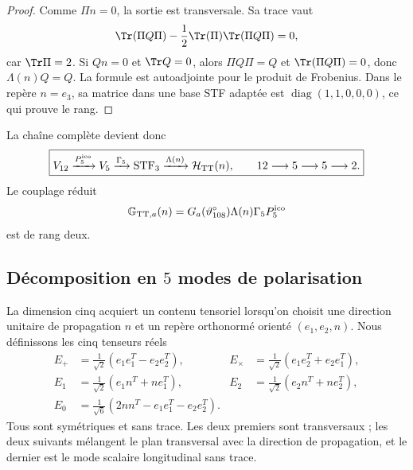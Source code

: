 \begin{proof}
Comme \(\Pi n=0\), la sortie est transversale. Sa trace vaut
\[
\Tr(\Pi Q\Pi)-\frac12\Tr(\Pi)\Tr(\Pi Q\Pi)=0,
\]
car \(\Tr\Pi=2\). Si \(Qn=0\) et \(\Tr Q=0\), alors
\(\Pi Q\Pi=Q\) et \(\Tr(\Pi Q\Pi)=0\), donc
\(\Lambda(n)Q=Q\). La formule est autoadjointe pour le produit de
Frobenius. Dans le repère \(n=e_3\), sa matrice dans une base STF adaptée est
\(\operatorname{diag}(1,1,0,0,0)\), ce qui prouve le rang.
\end{proof}

La chaîne complète devient donc
\begin{equation}
\label{ii:pent:eq:gravity-12-5-5-2}
\boxed{
V_{12}\xrightarrow{P^{\mathrm{ico}}_5}V_5
\xrightarrow{\Gamma_5}\operatorname{STF}_3
\xrightarrow{\Lambda(n)}\mathcal H_{\rm TT}(n),
\qquad 12\longrightarrow5\longrightarrow5\longrightarrow2.}
\end{equation}
Le couplage réduit
\begin{equation}
\label{ii:pent:eq:gravity-effective-map}
\mathbb G_{{\rm TT},a}(n)
=G_a(\vartheta^\circ_{108})\Lambda(n)\Gamma_5P^{\mathrm{ico}}_5
\end{equation}
est de rang deux.

\subsection{Décomposition en \(5\) modes de polarisation}

La dimension cinq acquiert un contenu tensoriel lorsqu’on choisit une direction
unitaire de propagation \(n\) et un repère orthonormé orienté
\((e_1,e_2,n)\). Nous définissons les cinq tenseurs réels
\begin{align}
E_{+}&=\frac1{\sqrt2}(e_1e_1^T-e_2e_2^T),
&E_{\times}&=\frac1{\sqrt2}(e_1e_2^T+e_2e_1^T),
\label{ii:pent:eq:gravity-helicity2-real}\\
E_{1}&=\frac1{\sqrt2}(e_1n^T+ne_1^T),
&E_{2}&=\frac1{\sqrt2}(e_2n^T+ne_2^T),
\label{ii:pent:eq:gravity-helicity1-real}\\
E_{0}&=\frac1{\sqrt6}(2nn^T-e_1e_1^T-e_2e_2^T).
\label{ii:pent:eq:gravity-helicity0-real}
\end{align}
Tous sont symétriques et sans trace. Les deux premiers sont transversaux ; les
deux suivants mélangent le plan transversal avec la direction de
propagation, et le dernier est le mode scalaire longitudinal sans trace.

